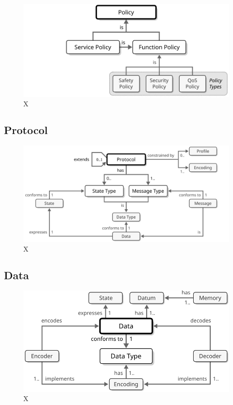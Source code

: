 \begin{figure}[ht!]
  \centering
  \includegraphics[scale=0.9]{figures/policy}
  \caption{
    X
  }
  \label{fig:policy}
\end{figure}

\subsection{Protocol}
\label{sec:reference-model:protocol}

\begin{figure}[ht!]
  \centering
  \includegraphics[scale=0.9]{figures/protocol}
  \caption{
    X
  }
  \label{fig:protocol}
\end{figure}


\subsection{Data}
\label{sec:reference-model:data}

\begin{figure}[ht!]
  \centering
  \includegraphics[scale=0.9]{figures/data}
  \caption{
    X
  }
  \label{fig:data}
\end{figure}